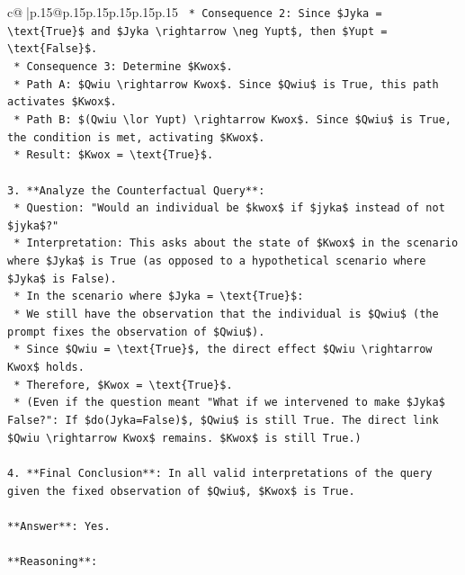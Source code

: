 \documentclass{article}
\begin{document}
{\begin{supertabular}{c@{$\;$}|p{.15\linewidth}@{}p{.15\linewidth}p{.15\linewidth}p{.15\linewidth}p{.15\linewidth}p{.15\linewidth}}
{{{\texttt{    *   Consequence 2: Since \$Jyka = \textbackslash{}text\{True\}\$ and \$Jyka \textbackslash{}rightarrow \textbackslash{}neg Yupt\$, then \$Yupt = \textbackslash{}text\{False\}\$.} \\
\texttt{    *   Consequence 3: Determine \$Kwox\$.} \\
\texttt{        *   Path A: \$Qwiu \textbackslash{}rightarrow Kwox\$. Since \$Qwiu\$ is True, this path activates \$Kwox\$.} \\
\texttt{        *   Path B: \$(Qwiu \textbackslash{}lor Yupt) \textbackslash{}rightarrow Kwox\$. Since \$Qwiu\$ is True, the condition is met, activating \$Kwox\$.} \\
\texttt{    *   Result: \$Kwox = \textbackslash{}text\{True\}\$.} \\
\\ 
\texttt{3.  **Analyze the Counterfactual Query**:} \\
\texttt{    *   Question: "Would an individual be \$kwox\$ if \$jyka\$ instead of not \$jyka\$?"} \\
\texttt{    *   Interpretation: This asks about the state of \$Kwox\$ in the scenario where \$Jyka\$ is True (as opposed to a hypothetical scenario where \$Jyka\$ is False).} \\
\texttt{    *   In the scenario where \$Jyka = \textbackslash{}text\{True\}\$:} \\
\texttt{        *   We still have the observation that the individual is \$Qwiu\$ (the prompt fixes the observation of \$Qwiu\$).} \\
\texttt{        *   Since \$Qwiu = \textbackslash{}text\{True\}\$, the direct effect \$Qwiu \textbackslash{}rightarrow Kwox\$ holds.} \\
\texttt{        *   Therefore, \$Kwox = \textbackslash{}text\{True\}\$.} \\
\texttt{    *   (Even if the question meant "What if we intervened to make \$Jyka\$ False?": If \$do(Jyka=False)\$, \$Qwiu\$ is still True. The direct link \$Qwiu \textbackslash{}rightarrow Kwox\$ remains. \$Kwox\$ is still True.)} \\
\\ 
\texttt{4.  **Final Conclusion**: In all valid interpretations of the query given the fixed observation of \$Qwiu\$, \$Kwox\$ is True.} \\
\\ 
\texttt{**Answer**: Yes.} \\
\\ 
\texttt{**Reasoning**:} \\
}}}
\end{supertabular}}
\end{document}
